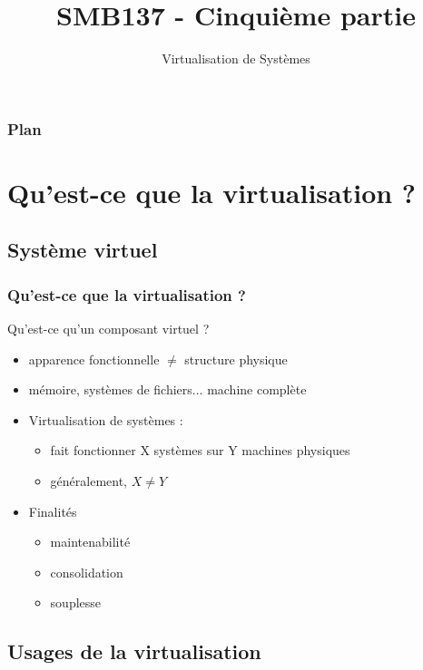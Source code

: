 

\title{SMB137 - Cinquième partie}
\subtitle{Virtualisation de Systèmes}


\frame[plain]{\titlepage}


\begin{frame}
 \frametitle{Plan}
 \tableofcontents
\end{frame}

\section{Qu'est-ce que la virtualisation ?}

\subsection{Système virtuel}

\begin{frame}
\frametitle{Qu'est-ce que la virtualisation ?}
\begin{block}{Qu'est-ce qu'un composant virtuel ?}
\begin{itemize}
\item apparence fonctionnelle $\ne$ structure physique
\item mémoire, systèmes de fichiers... machine complète
\end{itemize}
\end{block}
\begin{itemize}
\item <2>Virtualisation de systèmes :
\begin{itemize}
\item fait fonctionner X systèmes sur Y machines physiques
\item généralement, $X \ne Y$
\end{itemize}
\item <3>Finalités
\begin{itemize}
\item maintenabilité
\item consolidation
\item souplesse
\end{itemize}
\end{itemize}
\end{frame}

\subsection{Usages de la virtualisation}

